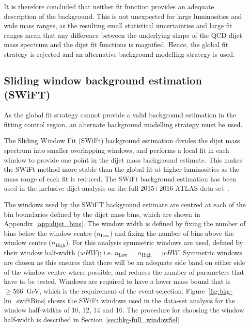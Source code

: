 It is therefore concluded that neither fit function provides an adequate description of the background.
This is not unexpected for large luminosities and wide mass ranges,
as the resulting small statistical uncertainties and large fit ranges mean that any
difference between the underlying shape of the QCD dijet mass spectrum
and the dijet fit functions is magnified.
Hence, the global fit strategy is rejected and an alternative background modelling strategy is used.


\newpage
\subsection{Sliding window background estimation (SWiFT)}\label{sec:bkg-full_swift}

As the global fit strategy cannot provide a valid background estimation in the
\lm{} fitting control region, an alternate background modelling strategy must be used.

The Sliding Window Fit (SWiFt) background estimation divides the dijet mass spectrum into smaller overlapping windows,
and performs a local fit in each window to provide one point in the dijet mass background estimate.
This makes the SWiFt method more stable than the global fit at higher luminosities as the mass range of each fit is reduced.
The SWiFt background estimation has been used in the inclusive dijet analysis on the full 2015+2016 ATLAS data-set~\cite{dijet-mori17_paper}.

The windows used by the SWiFT background estimate are centred at each of the
bin boundaries defined by the dijet mass bins, which are shown in Appendix~\ref{app:dijet_bins}.
The window width is defined by fixing the number of bins below the window centre ($n_{\text{Low}}$)
and fixing the number of bins above the window centre ($n_{\text{High}}$).
For this analysis symmetric windows are used, defined by their window half-width ($wHW$); i.e. $n_{\text{Low}}$ = $n_{\text{High}}$ = $wHW$.
Symmetric windows are chosen as this ensures that there will be an adequate side band on either side of the window centre where possible,
and reduces the number of parameters that have to be tested.
Windows are required to have a lower mass bound that is $\geq566$~GeV, which is the \mjj{} requirement of the event-selection.
Figure~\ref{fig:bkg-lm_swiftBins} shows the SWiFt windows used in the \lm{} data-set analysis for the window half-widths of 10, 12, 14 and 16.
The procedure for choosing the window half-width is described in Section~\ref{sec:bkg-full_windowSel}

